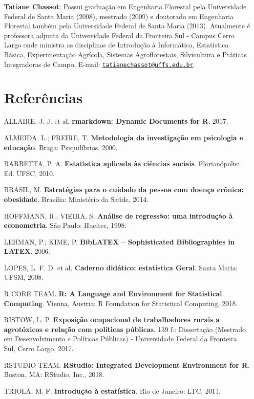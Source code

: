 \documentclass[12pt,brazil,oneside]{book}
\begin{document}
\textbf{Tatiane Chassot}: Possui graduação em Engenharia Florestal pela Universidade Federal de Santa Maria (2008), mestrado (2009) e doutorado em Engenharia Florestal também pela Universidade Federal de Santa Maria (2013). Atualmente é professora adjunta da Universidade Federal da Fronteira Sul - Campus Cerro Largo onde ministra as disciplinas de Introdução à Informática, Estatística Básica, Experimentação Agrícola, Sistemas Agroflorestais, Silvicultura e Práticas Integradoras de Campo. E-mail: \href{mailto:tatianechassot@uffs.edu.br}{\nolinkurl{tatianechassot@uffs.edu.br}}.

\setlength{\parindent}{0.0cm}

\RaggedRight

\frenchspacing

\hypertarget{referencias}{%
\chapter*{Referências}\label{referencias}}

\hypertarget{refs}{}
\leavevmode\hypertarget{ref-R-rmarkdown}{}%
ALLAIRE, J. J. et al. \textbf{rmarkdown: Dynamic Documents for R}. 2017.

\leavevmode\hypertarget{ref-almeida2000}{}%
ALMEIDA, L.; FREIRE, T. \textbf{Metodologia da investigação em psicologia e educação}. Braga: Psiquilíbrios, 2000.

\leavevmode\hypertarget{ref-barbetta1988}{}%
BARBETTA, P. A. \textbf{Estatı́stica aplicada às ciências sociais}. Florianópolis: Ed. UFSC, 2010.

\leavevmode\hypertarget{ref-brasil2014}{}%
BRASIL, M. \textbf{Estratégias para o cuidado da pessoa com doença crônica: obesidade}. Brasília: Ministério da Saúde, 2014.

\leavevmode\hypertarget{ref-hoffmann1998}{}%
HOFFMANN, R.; VIEIRA, S. \textbf{Análise de regressão: uma introdução à econometria}. São Paulo: Hucitec, 1998.

\leavevmode\hypertarget{ref-biblatex}{}%
LEHMAN, P.; KIME, P. \textbf{BibLATEX -- Sophisticated Bibliographies in LATEX}. 2006.

\leavevmode\hypertarget{ref-lopes2008}{}%
LOPES, L. F. D. et al. \textbf{Caderno didático: estatística Geral}. Santa Maria: UFSM, 2008.

\leavevmode\hypertarget{ref-rcore}{}%
R CORE TEAM. \textbf{R: A Language and Environment for Statistical Computing}. Vienna, Austria: R Foundation for Statistical Computing, 2018.

\leavevmode\hypertarget{ref-Ristow2017}{}%
RISTOW, L. P. \textbf{Exposição ocupacional de trabalhadores rurais a agrotóxicos e relação com políticas públicas}. 139 f.: Dissertação (Mestrado em Desenvolvimento e Políticas Públicas) - Universidade Federal da Fronteira Sul, Cerro Largo, 2017.

\leavevmode\hypertarget{ref-teamrstudio}{}%
RSTUDIO TEAM. \textbf{RStudio: Integrated Development Environment for R}. Boston, MA: RStudio, Inc., 2018.

\leavevmode\hypertarget{ref-triola1999}{}%
TRIOLA, M. F. \textbf{Introdução à estatística}. Rio de Janeiro: LTC, 2011.
\end{document}
